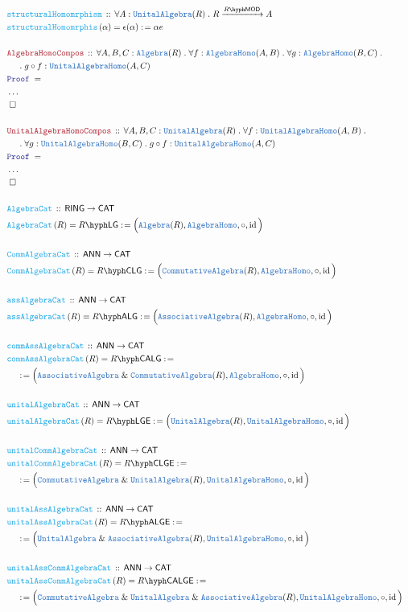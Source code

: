 \documentclass[12pt]{scrartcl}%
\newcommand{\TYPE}[1]{\textcolor{NavyBlue}{\mathtt{#1}}}%
\newcommand{\FUNC}[1]{\textcolor{Cerulean}{\mathtt{#1}}}%
\newcommand{\LOGIC}[1]{\textcolor{Blue}{\mathtt{#1}}}%
\newcommand{\THM}[1]{\textcolor{Maroon}{\mathtt{#1}}}%
\renewcommand{\.}{\; . \;} %
\newcommand{\de}{: \kern 0.1pc =} %
\newcommand{\Act}[1]{\left( #1 \right)} %
\newcommand{\Theorem}[2]{& \THM{#1} \, :: \, #2 \\ & \Proof = \\ } %
\newcommand{\DeclareFunc}[2]{& \FUNC{#1} \, :: \, #2 \\}%
\newcommand{\DefineNamedFunc}[4]{&  \FUNC{#1}\Act{#2} = #3 \de #4 \\}%
\newcommand{\NewLine}{\\ & \kern 1pc}%
\newcommand{\Page}[1]{ \begin{align*} #1 \end{align*}  }%
\newcommand{\NoProof}{ & \ldots \\ \EndProof}%
\renewcommand{\And}{\; \& \;}%
\DeclareMathOperator*{\id}{id}%
\newcommand{\QED}{\; \square} %
\newcommand{\EndProof}{& \QED \\} %
\newcommand{\Proof}{\LOGIC{Proof} \; } %
\newcommand{\Arrow}[1]{\xrightarrow{#1}}%
\newcommand{\CAT}{\mathsf{CAT}} %
\newcommand{\LMOD}[1]{#1\hyph\mathsf{MOD}} %
\newcommand{\RING}{\mathsf{RING}} %
\newcommand{\ANN}{\mathsf{ANN}} %
\newcommand{\Algebra}{\TYPE{Algebra}}
\newcommand{\LALG}[1]{#1\hyph\mathsf{ALG}}%
\newcommand{\LALGE}[1]{#1\hyph\mathsf{ALGE}}%
\newcommand{\LLGE}[1]{#1\hyph\mathsf{LGE}}%
\newcommand{\LLG}[1]{#1\hyph\mathsf{LG}}%
\newcommand{\LCALG}[1]{#1\hyph\mathsf{CALG}}%
\newcommand{\LCALGE}[1]{#1\hyph\mathsf{CALGE}}%
\newcommand{\LCLGE}[1]{#1\hyph\mathsf{CLGE}}%
\newcommand{\LCLG}[1]{#1\hyph\mathsf{CLG}}%
\begin{document}
\Page{
	\\
	\DeclareFunc{structuralHomomrphism}{\forall A : \TYPE{UnitalAlgebra}(R) \.  R \Arrow{\LMOD{R}} A   }
	\DefineNamedFunc{structuralHomomrphis}{\alpha}{\epsilon(\alpha)}{\alpha e}
	\\
	\Theorem{AlgebraHomoCompos}{\forall A,B,C : \Algebra(R) \. \forall f : \TYPE{AlgebraHomo}(A,B) \. \forall g : \TYPE{AlgebraHomo}(B,C) \. 
	 	\NewLine \. g \circ f : \TYPE{UnitalAlgebraHomo}(A,C)}
	\NoProof
	\\
	\Theorem{UnitalAlgebraHomoCompos}{\forall A,B,C : \TYPE{UnitalAlgebra}(R) \. \forall f : \TYPE{UnitalAlgebraHomo}(A,B) \. \NewLine \. \forall g : \TYPE{UnitalAlgebraHomo}(B,C) \. 
		g \circ f : \TYPE{UnitalAlgebraHomo}(A,C)}
	\NoProof
	\\
	\DeclareFunc{AlgebraCat}{\RING \to \CAT}
	\DefineNamedFunc{AlgebraCat}{R}{\LLG{R}}{\Big( \TYPE{\Algebra}(R), \TYPE{AlgebraHomo},\circ,\id \Big)}
	\\
	\DeclareFunc{CommAlgebraCat}{\ANN \to \CAT}
	\DefineNamedFunc{CommAlgebraCat}{R}{\LCLG{R}}{\Big( \TYPE{CommutativeAlgebra}(R), \TYPE{AlgebraHomo},\circ,\id \Big)}		
	\\
	\DeclareFunc{assAlgebraCat}{\ANN \to \CAT}
	\DefineNamedFunc{assAlgebraCat}{R}{\LALG{R}}{\Big( \TYPE{AssociativeAlgebra}(R), \TYPE{AlgebraHomo},\circ,\id \Big)}
	\\
	\DeclareFunc{commAssAlgebraCat}{\ANN \to \CAT}
	\DefineNamedFunc{commAssAlgebraCat}{R}{\LCALG{R}}{\NewLine \de \Big( \TYPE{AssociativeAlgebra} \And \TYPE{CommutativeAlgebra}(R), \TYPE{AlgebraHomo},\circ,\id \Big)}		
	\\
	\DeclareFunc{unitalAlgebraCat}{\ANN \to \CAT}
	\DefineNamedFunc{unitalAlgebraCat}{R}{\LLGE{R}}{\Big( \TYPE{UnitalAlgebra}(R), \TYPE{UnitalAlgebraHomo},\circ,\id \Big)}
	\\
	\DeclareFunc{unitalCommAlgebraCat}{\ANN \to \CAT}
	\DefineNamedFunc{unitalCommAlgebraCat}{R}{\LCLGE{R}}{\NewLine \de \Big( \TYPE{CommutativeAlgebra} \And \TYPE{UnitalAlgebra}(R), \TYPE{UnitalAlgebraHomo},\circ,\id \Big)}		
	\\
	\DeclareFunc{unitalAssAlgebraCat}{\ANN \to \CAT}
	\DefineNamedFunc{unitalAssAlgebraCat}{R}{\LALGE{R}}{\NewLine \de \Big( \TYPE{UnitalAlgebra} \And \TYPE{AssociativeAlgebra}(R), \TYPE{UnitalAlgebraHomo},\circ,\id \Big)}
	\\
	\DeclareFunc{unitalAssCommAlgebraCat}{\ANN \to \CAT}
	\DefineNamedFunc{unitalAssCommAlgebraCat}{R}{\LCALGE{R}}{\NewLine \de \Big( \TYPE{CommutativeAlgebra} \And \TYPE{UnitalAlgebra} \And \TYPE{AssociativeAlgebra}(R), \TYPE{UnitalAlgebraHomo},\circ,\id \Big)}		
}
\end{document}
